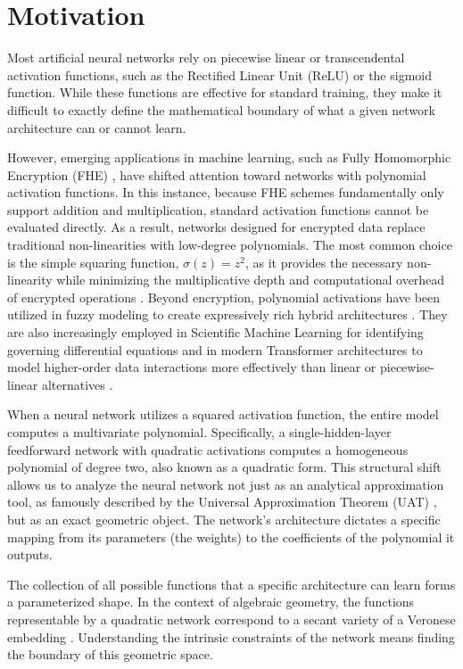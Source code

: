 \section{Motivation}

Most artificial neural networks rely on piecewise linear or transcendental activation functions, such as the Rectified Linear Unit (ReLU) or the sigmoid function. While these functions are effective for standard training, they make it difficult to exactly define the mathematical boundary of what a given network architecture can or cannot learn. 

However, emerging applications in machine learning, such as Fully Homomorphic Encryption (FHE) \cite{gentry2009fhe}, have shifted attention toward networks with polynomial activation functions. In this instance, because FHE schemes fundamentally only support addition and multiplication, standard activation functions cannot be evaluated directly. As a result, networks designed for encrypted data replace traditional non-linearities with low-degree polynomials. The most common choice is the simple squaring function, $\sigma(z) = z^2$, as it provides the necessary non-linearity while minimizing the multiplicative depth and computational overhead of encrypted operations \cite{lee2021sisyphus}. Beyond encryption, polynomial activations have been utilized in fuzzy modeling to create expressively rich hybrid architectures \cite{park2002fuzzy}. They are also increasingly employed in Scientific Machine Learning for identifying governing differential equations \cite{petersen2023odes} and in modern Transformer architectures to model higher-order data interactions more effectively than linear or piecewise-linear alternatives \cite{zhuo2025polycom}.

When a neural network utilizes a squared activation function, the entire model computes a multivariate polynomial. Specifically, a single-hidden-layer feedforward network with quadratic activations computes a homogeneous polynomial of degree two, also known as a quadratic form. This structural shift allows us to analyze the neural network not just as an analytical approximation tool, as famously described by the Universal Approximation Theorem (UAT) \cite{cybenko1989uat}, but as an exact geometric object. The network's architecture dictates a specific mapping from its parameters (the weights) to the coefficients of the polynomial it outputs. 

The collection of all possible functions that a specific architecture can learn forms a parameterized shape. In the context of algebraic geometry, the functions representable by a quadratic network correspond to a secant variety of a Veronese embedding \cite{landsberg2012tensors}. Understanding the intrinsic constraints of the network means finding the boundary of this geometric space. 

